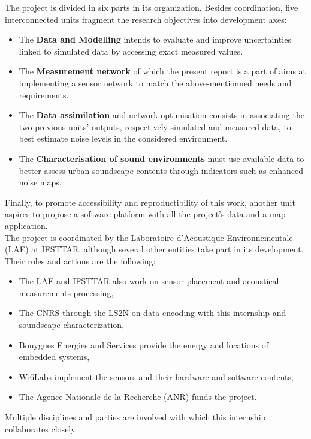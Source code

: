 \documentclass[12pt,times,onecolumn]{article}
\begin{document}
The project is divided in six parts in its organization. Besides coordination, five interconnected units fragment the research objectives into development axes:
\begin{itemize}
\item The \textbf{Data and Modelling} intends to evaluate and improve uncertainties linked to simulated data by accessing exact measured values.
\item The \textbf{Measurement network} of which the present report is a part of aims at implementing a sensor network to match the above-mentionned needs and requirements.
\item The \textbf{Data assimilation} and network optimisation consists in associating the two previous units' outputs, respectively simulated and measured data, to best estimate noise levels in the considered environment.
\item The \textbf{Characterisation of sound environments} must use available data to better assess urban soundscape contents through indicators such as enhanced noise maps.
\end{itemize}
Finally, to promote accessibility and reproductibility of this work, another unit aspires to propose a software platform with all the project's data and a map application.\\

The project is coordinated by the Laboratoire d'Acoustique Environnementale (LAE) at IFSTTAR, although several other entities take part in its development. Their roles and actions are the following:
\begin{itemize}
\item The LAE and IFSTTAR also work on sensor placement and acoustical measurements processing,
\item The CNRS through the LS2N on data encoding with this internship and soundscape characterization,
\item Bouygues Energies and Services provide the energy and locations of embedded systems,
\item Wi6Labs implement the sensors and their hardware and software contents,
\item The Agence Nationale de la Recherche (ANR) funds the project.
\end{itemize}
Multiple disciplines and parties are involved with which this internship collaborates closely.

\end{document}
